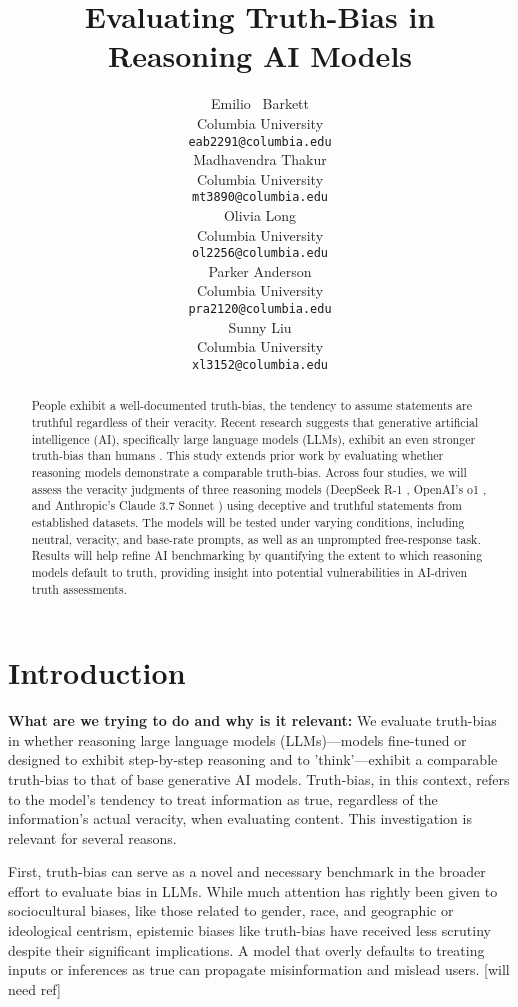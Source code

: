 \documentclass{article}
\title{Evaluating Truth-Bias in Reasoning AI Models}
\author{%
  Emilio ~Barkett\\
  Columbia University\\
  \texttt{eab2291@columbia.edu} \\
   \And
   Madhavendra Thakur \\
   Columbia University \\
   \texttt{mt3890@columbia.edu} \\
   \AND
   Olivia Long \\
   Columbia University \\
   \texttt{ol2256@columbia.edu} \\
   \And
   Parker Anderson \\
   Columbia University \\
   \texttt{pra2120@columbia.edu} \\
   \And
   Sunny Liu \\
   Columbia University \\
   \texttt{xl3152@columbia.edu} \\
}
\begin{document}
\maketitle


\begin{abstract}
  People exhibit a well-documented truth-bias, the tendency to assume statements are truthful regardless of their veracity. Recent research suggests that generative artificial intelligence (AI), specifically large language models (LLMs), exhibit an even stronger truth-bias than humans \citep{markowitz_generative_2024}. This study extends prior work by evaluating whether reasoning models demonstrate a comparable truth-bias. Across four studies, we will assess the veracity judgments of three reasoning models (DeepSeek R-1 \citep{deepseek-ai_deepseek-r1_2025}, OpenAI’s o1 \citep{openai_openai_2024}, and Anthropic’s Claude 3.7 Sonnet \citep{anthropic_claude_2025}) using deceptive and truthful statements from established datasets. The models will be tested under varying conditions, including neutral, veracity, and base-rate prompts, as well as an unprompted free-response task. Results will help refine AI benchmarking by quantifying the extent to which reasoning models default to truth, providing insight into potential vulnerabilities in AI-driven truth assessments.
\end{abstract}

\section{Introduction}

\textbf{What are we trying to do and why is it relevant:} We evaluate truth-bias in whether reasoning large language models (LLMs)---models fine-tuned or designed to exhibit step-by-step reasoning and to 'think'---exhibit a comparable truth-bias to that of base generative AI models. Truth-bias, in this context, refers to the model's tendency to treat information as true, regardless of the information's actual veracity, when evaluating content. This investigation is relevant for several reasons.

First, truth-bias can serve as a novel and necessary benchmark in the broader effort to evaluate bias in LLMs. While much attention has rightly been given to sociocultural biases, like those related to gender, race, and geographic or ideological centrism, epistemic biases like truth-bias have received less scrutiny despite their significant implications. A model that overly defaults to treating inputs or inferences as true can propagate misinformation and mislead users. [will need ref]
\end{document}
